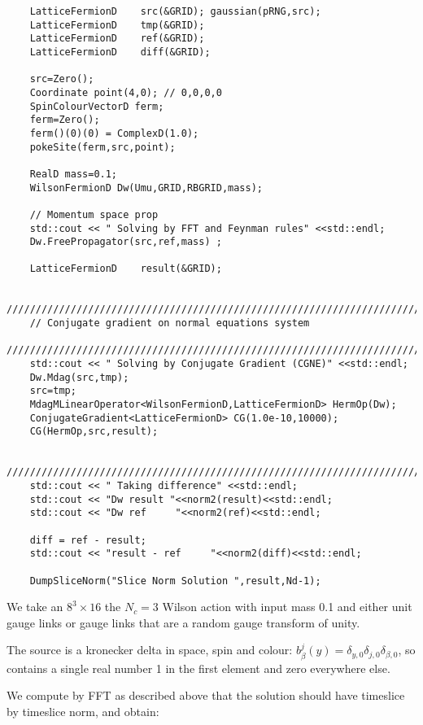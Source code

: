 \documentclass[letter,10pt]{report}
\begin{document}
\begin{verbatim}
    LatticeFermionD    src(&GRID); gaussian(pRNG,src);
    LatticeFermionD    tmp(&GRID);
    LatticeFermionD    ref(&GRID);
    LatticeFermionD    diff(&GRID);

    src=Zero();
    Coordinate point(4,0); // 0,0,0,0
    SpinColourVectorD ferm;
    ferm=Zero();
    ferm()(0)(0) = ComplexD(1.0);
    pokeSite(ferm,src,point);

    RealD mass=0.1;
    WilsonFermionD Dw(Umu,GRID,RBGRID,mass);

    // Momentum space prop
    std::cout << " Solving by FFT and Feynman rules" <<std::endl;
    Dw.FreePropagator(src,ref,mass) ;

    LatticeFermionD    result(&GRID); 
    
    ////////////////////////////////////////////////////////////////////////
    // Conjugate gradient on normal equations system
    ////////////////////////////////////////////////////////////////////////
    std::cout << " Solving by Conjugate Gradient (CGNE)" <<std::endl;
    Dw.Mdag(src,tmp);
    src=tmp;
    MdagMLinearOperator<WilsonFermionD,LatticeFermionD> HermOp(Dw);
    ConjugateGradient<LatticeFermionD> CG(1.0e-10,10000);
    CG(HermOp,src,result);
    
    ////////////////////////////////////////////////////////////////////////
    std::cout << " Taking difference" <<std::endl;
    std::cout << "Dw result "<<norm2(result)<<std::endl;
    std::cout << "Dw ref     "<<norm2(ref)<<std::endl;
    
    diff = ref - result;
    std::cout << "result - ref     "<<norm2(diff)<<std::endl;

    DumpSliceNorm("Slice Norm Solution ",result,Nd-1);
\end{verbatim}

We take an $8^3 \times 16$ the $N_c=3$ Wilson action with input mass 0.1 and either unit gauge links
or gauge links that are a random gauge transform of unity.

The source is a kronecker delta in space, spin and colour: $b_\beta^j(y)=\delta_{y,0}\delta_{j,0}\delta_{\beta,0}$,
so contains a single real number 1 in the first element and zero everywhere else.

We compute by FFT as described above that the solution should have timeslice by timeslice norm, and obtain:
\end{document}
